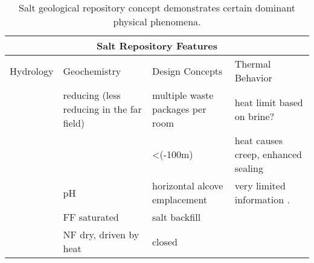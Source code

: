 %
\begin{table}
  \centering
  \footnotesize{
  \begin{tabular}{|l|l|l|l|}
    \multicolumn{4}{c}{\textbf{Salt Repository Features}}\\
    \hline
    Hydrology & Geochemistry & Design Concepts & Thermal Behavior \\ 
    \hline
    &reducing (less reducing in the far field)& multiple waste packages per room&heat limit based on brine?\\
    &&<(-100m)&heat causes creep, enhanced sealing\\
    &pH&horizontal alcove emplacement&very limited information .\\
    &FF saturated&salt backfill&\\
    &NF dry, driven by heat &closed&\\
    \hline
  \end{tabular}
  \caption[Salt Repository Features]{Salt geological repository 
  concept demonstrates certain dominant physical phenomena. }
  \label{tab:salt_tab}
  }
\end{table}


